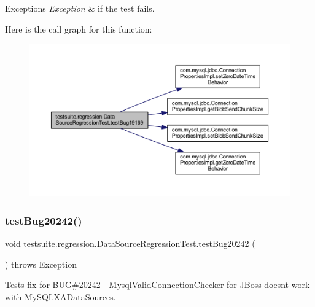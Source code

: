 \begin{DoxyExceptions}{Exceptions}
{\em Exception} & if the test fails. \\
\hline
\end{DoxyExceptions}
Here is the call graph for this function\+:
\nopagebreak
\begin{figure}[H]
\begin{center}
\leavevmode
\includegraphics[width=350pt]{classtestsuite_1_1regression_1_1_data_source_regression_test_a9ef6137b8f62a30be45c74a81be1d299_cgraph}
\end{center}
\end{figure}
\mbox{\label{classtestsuite_1_1regression_1_1_data_source_regression_test_a59191cb9aeb387f68d1d484356d9c744}} 
\subsubsection{\texorpdfstring{test\+Bug20242()}{testBug20242()}}
{\footnotesize\ttfamily void testsuite.\+regression.\+Data\+Source\+Regression\+Test.\+test\+Bug20242 (\begin{DoxyParamCaption}{ }\end{DoxyParamCaption}) throws Exception}

Tests fix for B\+UG\#20242 -\/ Mysql\+Valid\+Connection\+Checker for J\+Boss doesn\textquotesingle{}t work with My\+S\+Q\+L\+X\+A\+Data\+Sources.


